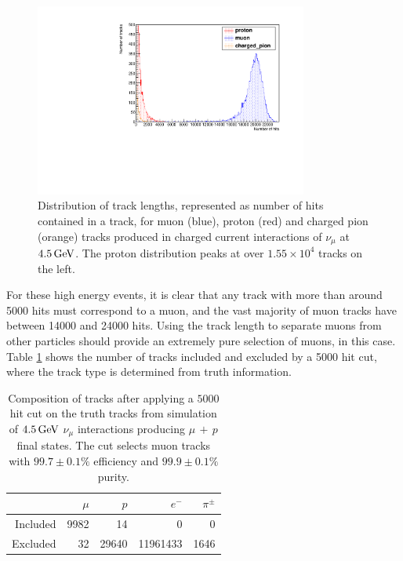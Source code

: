 \begin{figure}
\centering
\includegraphics[angle=-90,width=0.8\textwidth]{chapters/particleid_images/ccqe-4500-track-lengths}
\caption[Track length distributions for $\mu$, $p$ and $\pi^+$ from $4.5\GeV$ neutrinos (CCQE)]{\label{fig:ccqe-track-lengths-4500MeV}Distribution of track lengths, represented as number of hits contained in a track, for muon (blue), proton (red) and charged pion (orange) tracks produced in charged current interactions of $\nu_\mu$ at $4.5\GeV$. The proton distribution peaks at over $1.55\times10^4$ tracks on the left.}
\end{figure}

For these high energy events, it is clear that any track with more than around 5000 hits must correspond to a muon, and the vast majority of muon tracks have between 14000 and 24000 hits. Using the track length to separate muons from other particles should provide an extremely pure selection of muons, in this case. Table \ref{table:cut-results-ccqe-4.5} shows the number of tracks included and excluded by a 5000 hit cut, where the track type is determined from truth information.

\begin{table}
\centering
\begin{tabular}{*{5}{r}}
 & $\mu$ & $p$ & $e^-$ & $\pi^\pm$ \\
\hline
\hline
Included & 9982 & 14 & 0 & 0 \\
Excluded & 32 & 29640 & 11961433 & 1646 \\
\hline
\end{tabular}
\caption[Composition of tracks after $5000$ hit cut on $4.5\GeV$ CCQE events]{\label{table:cut-results-ccqe-4.5}Composition of tracks after applying a $5000$ hit cut on the truth tracks from simulation of $4.5\GeV$ $\nu_\mu$ interactions producing $\mu\, +\,p$ final states. The cut selects muon tracks with $99.7\pm0.1\%$ efficiency and $99.9\pm0.1\%$ purity.}
\end{table}


